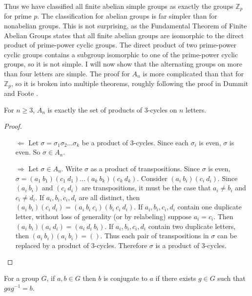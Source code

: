 \documentclass[a4paper]{article}
\begin{document}
Thus we have classified all finite abelian simple groups as exactly the groups $\mathbb{Z}_p$ for prime $p$. The classification for abelian groups is far simpler than for nonabelian groups. This is not surprising, as the Fundamental Theorem of Finite Abelian Groups states that all finite abelian groups are isomorphic to the direct product of prime-power cyclic groups. The direct product of two prime-power cyclic groups contains a subgroup isomorphic to one of the prime-power cyclic groups, so it is not simple. I will now show that the alternating groups on more than four letters are simple. The proof for $A_n$ is more complicated than that for $\mathbb{Z}_p$, so it is broken into multiple theorems, roughly following the proof in Dummit and Foote \cite{dummit}.

\begin{theorem}
\label{generatethm}
For $n \ge 3$, $A_n$ is exactly the set of products of 3-cycles on $n$ letters.
\end{theorem}
\begin{proof}~
\begin{enumerate}
\item[$\Leftarrow$]
Let $\sigma = \sigma_1 \sigma_2 ... \sigma_k$ be a product of 3-cycles. Since each $\sigma_i$ is even, $\sigma$ is even. So $\sigma \in A_n$.
\item[$\Rightarrow$]
Let $\sigma \in A_n$. Write $\sigma$ as a product of transpositions. Since $\sigma$ is even, $\sigma=(a_1\ b_1)(c_1\ d_1)...(a_k\ b_k)(c_k\ d_k)$. Consider $(a_i\ b_i)(c_i\ d_i)$. Since $(a_i\ b_i)$ and $(c_i\ d_i)$ are transpositions, it must be the case that $a_i \ne b_i$ and $c_i \ne d_i$. If $a_i, b_i, c_i, d_i$ are all distinct, then $(a_i\ b_i)(c_i\ d_i) = (a_i\ b_i\ c_i)(b_i\ c_i\ d_i)$. If $a_i, b_i, c_i, d_i$ contain one duplicate letter, without loss of generality (or by relabeling) suppose $a_i = c_i$. Then $(a_i\ b_i)(a_i\ d_i) = (a_i\ d_i\ b_i)$. If $a_i, b_i, c_i, d_i$ contain two duplicate letters, then $(a_i\ b_i)(a_i\ b_i) = ()$. Thus each pair of transpositions in $\sigma$ can be replaced by a product of 3-cycles. Therefore $\sigma$ is a product of 3-cycles.
\end{enumerate}
\end{proof}

\begin{definition}
For a group $G$, if $a, b \in G$ then $b$ is conjugate to $a$ if there exists $g \in G$ such that $g a g^{-1} = b$.
\end{definition}
\end{document}
